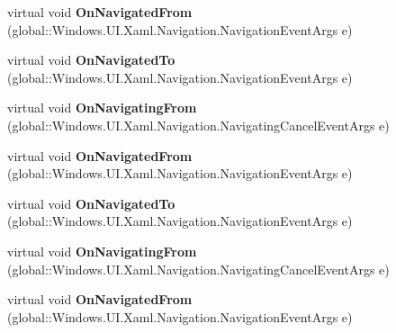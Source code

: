 \begin{DoxyCompactItemize}
\item 
\mbox{\label{class_windows_1_1_u_i_1_1_xaml_1_1_controls_1_1_page_a981a7d0a48be93271a0990797a1ad7b2}} 
virtual void {\bfseries On\+Navigated\+From} (global\+::\+Windows.\+U\+I.\+Xaml.\+Navigation.\+Navigation\+Event\+Args e)
\item 
\mbox{\label{class_windows_1_1_u_i_1_1_xaml_1_1_controls_1_1_page_af4fc4f6a9eac8ff3516e646626d6a742}} 
virtual void {\bfseries On\+Navigated\+To} (global\+::\+Windows.\+U\+I.\+Xaml.\+Navigation.\+Navigation\+Event\+Args e)
\item 
\mbox{\label{class_windows_1_1_u_i_1_1_xaml_1_1_controls_1_1_page_acc18e64ca5ff3650ce4467a152c21f1a}} 
virtual void {\bfseries On\+Navigating\+From} (global\+::\+Windows.\+U\+I.\+Xaml.\+Navigation.\+Navigating\+Cancel\+Event\+Args e)
\item 
\mbox{\label{class_windows_1_1_u_i_1_1_xaml_1_1_controls_1_1_page_a981a7d0a48be93271a0990797a1ad7b2}} 
virtual void {\bfseries On\+Navigated\+From} (global\+::\+Windows.\+U\+I.\+Xaml.\+Navigation.\+Navigation\+Event\+Args e)
\item 
\mbox{\label{class_windows_1_1_u_i_1_1_xaml_1_1_controls_1_1_page_af4fc4f6a9eac8ff3516e646626d6a742}} 
virtual void {\bfseries On\+Navigated\+To} (global\+::\+Windows.\+U\+I.\+Xaml.\+Navigation.\+Navigation\+Event\+Args e)
\item 
\mbox{\label{class_windows_1_1_u_i_1_1_xaml_1_1_controls_1_1_page_acc18e64ca5ff3650ce4467a152c21f1a}} 
virtual void {\bfseries On\+Navigating\+From} (global\+::\+Windows.\+U\+I.\+Xaml.\+Navigation.\+Navigating\+Cancel\+Event\+Args e)
\item 
\mbox{\label{class_windows_1_1_u_i_1_1_xaml_1_1_controls_1_1_page_a981a7d0a48be93271a0990797a1ad7b2}} 
virtual void {\bfseries On\+Navigated\+From} (global\+::\+Windows.\+U\+I.\+Xaml.\+Navigation.\+Navigation\+Event\+Args e)

\end{DoxyCompactItemize}
